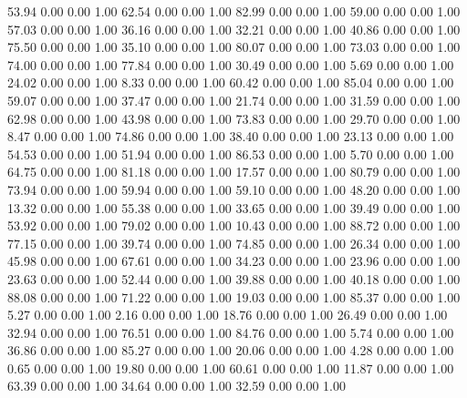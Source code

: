    53.94   0.00   0.00   1.00
   62.54   0.00   0.00   1.00
   82.99   0.00   0.00   1.00
   59.00   0.00   0.00   1.00
   57.03   0.00   0.00   1.00
   36.16   0.00   0.00   1.00
   32.21   0.00   0.00   1.00
   40.86   0.00   0.00   1.00
   75.50   0.00   0.00   1.00
   35.10   0.00   0.00   1.00
   80.07   0.00   0.00   1.00
   73.03   0.00   0.00   1.00
   74.00   0.00   0.00   1.00
   77.84   0.00   0.00   1.00
   30.49   0.00   0.00   1.00
    5.69   0.00   0.00   1.00
   24.02   0.00   0.00   1.00
    8.33   0.00   0.00   1.00
   60.42   0.00   0.00   1.00
   85.04   0.00   0.00   1.00
   59.07   0.00   0.00   1.00
   37.47   0.00   0.00   1.00
   21.74   0.00   0.00   1.00
   31.59   0.00   0.00   1.00
   62.98   0.00   0.00   1.00
   43.98   0.00   0.00   1.00
   73.83   0.00   0.00   1.00
   29.70   0.00   0.00   1.00
    8.47   0.00   0.00   1.00
   74.86   0.00   0.00   1.00
   38.40   0.00   0.00   1.00
   23.13   0.00   0.00   1.00
   54.53   0.00   0.00   1.00
   51.94   0.00   0.00   1.00
   86.53   0.00   0.00   1.00
    5.70   0.00   0.00   1.00
   64.75   0.00   0.00   1.00
   81.18   0.00   0.00   1.00
   17.57   0.00   0.00   1.00
   80.79   0.00   0.00   1.00
   73.94   0.00   0.00   1.00
   59.94   0.00   0.00   1.00
   59.10   0.00   0.00   1.00
   48.20   0.00   0.00   1.00
   13.32   0.00   0.00   1.00
   55.38   0.00   0.00   1.00
   33.65   0.00   0.00   1.00
   39.49   0.00   0.00   1.00
   53.92   0.00   0.00   1.00
   79.02   0.00   0.00   1.00
   10.43   0.00   0.00   1.00
   88.72   0.00   0.00   1.00
   77.15   0.00   0.00   1.00
   39.74   0.00   0.00   1.00
   74.85   0.00   0.00   1.00
   26.34   0.00   0.00   1.00
   45.98   0.00   0.00   1.00
   67.61   0.00   0.00   1.00
   34.23   0.00   0.00   1.00
   23.96   0.00   0.00   1.00
   23.63   0.00   0.00   1.00
   52.44   0.00   0.00   1.00
   39.88   0.00   0.00   1.00
   40.18   0.00   0.00   1.00
   88.08   0.00   0.00   1.00
   71.22   0.00   0.00   1.00
   19.03   0.00   0.00   1.00
   85.37   0.00   0.00   1.00
    5.27   0.00   0.00   1.00
    2.16   0.00   0.00   1.00
   18.76   0.00   0.00   1.00
   26.49   0.00   0.00   1.00
   32.94   0.00   0.00   1.00
   76.51   0.00   0.00   1.00
   84.76   0.00   0.00   1.00
    5.74   0.00   0.00   1.00
   36.86   0.00   0.00   1.00
   85.27   0.00   0.00   1.00
   20.06   0.00   0.00   1.00
    4.28   0.00   0.00   1.00
    0.65   0.00   0.00   1.00
   19.80   0.00   0.00   1.00
   60.61   0.00   0.00   1.00
   11.87   0.00   0.00   1.00
   63.39   0.00   0.00   1.00
   34.64   0.00   0.00   1.00
   32.59   0.00   0.00   1.00
